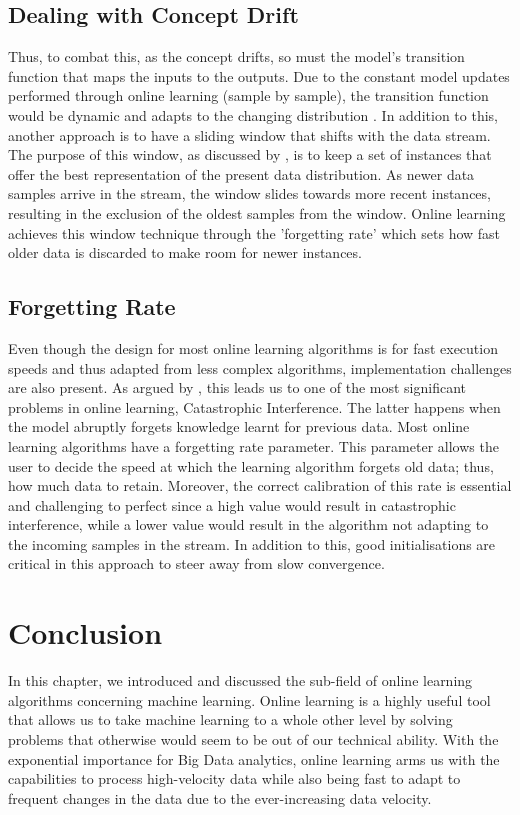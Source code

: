 \subsection{Dealing with Concept Drift}

Thus, to combat this, as the concept drifts, so must the model's transition function that maps the inputs to the outputs. Due to the constant model updates performed through online learning (sample by sample), the transition function would be dynamic and adapts to the changing distribution \citep{Gama2014ASO, hoi_online_2018, Lane:1998:AOL:3000292.3000339}. In addition to this, another approach is to have a sliding window that shifts with the data stream. The purpose of this window, as discussed by \citet{wozniak_hybrid_2011}, is to keep a set of instances that offer the best representation of the present data distribution. As newer data samples arrive in the stream, the window slides towards more recent instances, resulting in the exclusion of the oldest samples from the window. Online learning achieves this window technique through the 'forgetting rate' which sets how fast older data is discarded to make room for newer instances. 

\subsection{Forgetting Rate}

Even though the design for most online learning algorithms is for fast execution speeds and thus adapted from less complex algorithms, implementation challenges are also present. As argued by \citet{gepperth_incremental_2016}, this leads us to one of the most significant problems in online learning, Catastrophic Interference. The latter happens when the model abruptly forgets knowledge learnt for previous data. Most online learning algorithms have a forgetting rate parameter. This parameter allows the user to decide the speed at which the learning algorithm forgets old data; thus, how much data to retain. Moreover, the correct calibration of this rate is essential and challenging to perfect since a high value would result in catastrophic interference, while a lower value would result in the algorithm not adapting to the incoming samples in the stream. In addition to this, good initialisations are critical in this approach to steer away from slow convergence.

\section{Conclusion}

In this chapter, we introduced and discussed the sub-field of online learning algorithms concerning machine learning. Online learning is a highly useful tool that allows us to take machine learning to a whole other level by solving problems that otherwise would seem to be out of our technical ability. With the exponential importance for Big Data analytics, online learning arms us with the capabilities to process high-velocity data while also being fast to adapt to frequent changes in the data due to the ever-increasing data velocity.